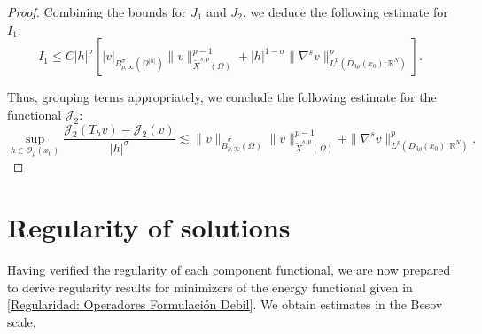 \documentclass[]{amsart}
\theoremstyle{definition}
\theoremstyle{definition}
\theoremstyle{remark}
\numberwithin{equation}{section}
\newcommand{\grads}{\nabla^{s}}
\begin{document}
\begin{proof}
Combining the bounds for \( J_1 \) and \( J_2 \), we deduce the following estimate for \( I_1 \):
\[
I_1 \leq C |h|^{\sigma} \left[ |v|_{B^{\sigma}_{p,\infty}(\Omega^{|h|})} \|v\|^{p-1}_{\widetilde{X}^{s,p}(\Omega)}  + |h|^{1-\sigma} \|\grads v\|^p_{L^p(D_{3\rho}(x_0);\mathbb{R}^N)} \right].
\]

Thus, grouping terms appropriately, we conclude the following estimate for the functional \( \mathcal{J}_2 \):
\[
\sup_{h \in \mathcal{O}_\rho\left(x_0\right)} \frac{\mathcal{J}_{2}\left(T_h v\right) - \mathcal{J}_{2}(v)}{|h|^{\sigma}} \lesssim  \|v\|_{\dot{B}^{\sigma}_{p,\infty}(\Omega)}\|v\|^{p-1}_{\widetilde{X}^{s,p}(\Omega)}+\|\grads v\|^{p}_{L^{p}(D_{3\rho}(x_0);\mathbb{R}^N)}.
\]
\end{proof}

	\section{Regularity of solutions}
    \label{sec:regularity}
	Having verified the regularity of each component functional, we are now prepared to derive regularity results for minimizers of the energy functional given in \eqref{Regularidad: Operadores Formulación Debil}. We obtain estimates in the Besov scale.
	
\end{document}
